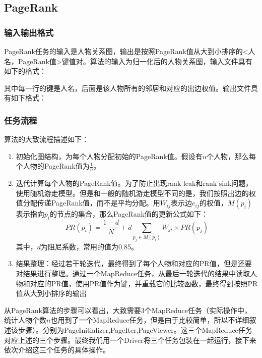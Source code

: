 \subsection{PageRank}
\subsubsection{输入输出格式}
PageRank任务的输入是人物关系图，输出是按照PageRank值从大到小排序的<人名，PageRank值>键值对。算法的输入为归一化后的人物关系图，输入文件具有如下的格式：
\begin{center}
\end{center}
其中每一行的键是人名，后面是该人物所有的邻居和对应的出边权值。输出文件具有如下格式：
\begin{center}
\end{center}
\subsubsection{任务流程}
算法的大致流程描述如下：
\begin{enumerate}
	\item 初始化图结构，为每个人物分配初始的PageRank值。假设有$n$个人物，那么每个人物的PageRank值为$\frac{1}{n}$。
	\item 迭代计算每个人物的PageRank值。为了防止出现rank leak和rank sink问题，使用随机游走模型。但是和一般的随机游走模型不同的是，我们按照出边的权值分配传递PageRank值，而不是平均分配。用$W_{ij}$表示边$e_{ij}$的权值，$M(p_i)$表示指向$p_i$的节点的集合，那么PageRank值的更新公式如下：
	\[
		PR(p_i) = \frac{1-d}{N} + d \sum_{p_j \in M(p_i)} W_{ji} \times PR(p_j)
	\]
	其中，$d$为阻尼系数，常用的值为0.85。
	\item 结果整理：经过若干轮迭代，最终得到了每个人物和对应的PR值，但是还要对结果进行整理。通过一个MapReduce任务，从最后一轮迭代的结果中读取人物和对应的PR值，使用PR值作为键，并重载它的比较函数，最终得到按照PR值从大到小排序的输出
\end{enumerate}
从PageRank算法的步骤可以看出，大致需要3个MapReduce任务（实际操作中，统计人物个数$n$也用到了一个MapReduce任务，但是由于比较简单，所以不详细叙述该步骤）。分别为PageInitializer,PageIter,PageViewer。这三个MapReduce任务对应上述的三个步骤。最终我们用一个Driver将三个任务包装在一起运行，接下来依次介绍这三个任务的具体操作。


